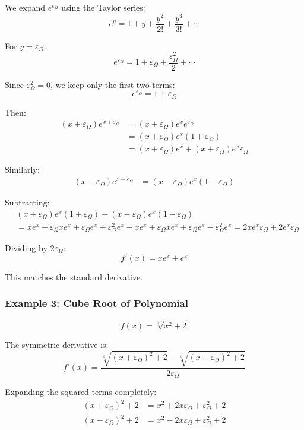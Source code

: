 \documentclass{article}
\begin{document}
We expand $e^{\varepsilon_\Omega}$ using the Taylor series:
$$e^y = 1 + y + \frac{y^2}{2!} + \frac{y^3}{3!} + \cdots$$

For $y = \varepsilon_\Omega$:
$$e^{\varepsilon_\Omega} = 1 + \varepsilon_\Omega + \frac{\varepsilon_\Omega^2}{2} + \cdots$$

Since $\varepsilon_\Omega^2 = 0$, we keep only the first two terms:
$$e^{\varepsilon_\Omega} = 1 + \varepsilon_\Omega$$

Then:
\begin{align*}
(x + \varepsilon_\Omega)e^{x + \varepsilon_\Omega} &= (x + \varepsilon_\Omega)e^x e^{\varepsilon_\Omega} \\
&= (x + \varepsilon_\Omega)e^x(1 + \varepsilon_\Omega) \\
&= (x + \varepsilon_\Omega)e^x + (x + \varepsilon_\Omega)e^x\varepsilon_\Omega
\end{align*}

Similarly:
\begin{align*}
(x - \varepsilon_\Omega)e^{x - \varepsilon_\Omega} &= (x - \varepsilon_\Omega)e^x(1 - \varepsilon_\Omega)
\end{align*}

Subtracting:
\begin{align*}
&(x + \varepsilon_\Omega)e^x(1 + \varepsilon_\Omega) - (x - \varepsilon_\Omega)e^x(1 - \varepsilon_\Omega) \\
&= xe^x+\varepsilon_\Omega xe^x+\varepsilon_\Omega e^x+\varepsilon_\Omega^2e^x-xe^x
+\varepsilon_\Omega xe^x+\varepsilon_\Omega e^x-\varepsilon_\Omega^2 e^x=2xe^x\varepsilon_\Omega + 2e^x\varepsilon_\Omega
\end{align*}

Dividing by $2\varepsilon_\Omega$:
$$f'(x) = xe^x + e^x$$

This matches the standard derivative.

\subsubsection{Example 3: Cube Root of Polynomial}

$$f(x) = \sqrt[3]{x^2 + 2}$$

The symmetric derivative is:
$$f'(x) = \frac{\sqrt[3]{(x + \varepsilon_\Omega)^2 + 2} - \sqrt[3]{(x - \varepsilon_\Omega)^2 + 2}}{2\varepsilon_\Omega}$$

Expanding the squared terms completely:
\begin{align*}
(x + \varepsilon_\Omega)^2 + 2 &= x^2 + 2x\varepsilon_\Omega + \varepsilon_\Omega^2 + 2 \\
(x - \varepsilon_\Omega)^2 + 2 &= x^2 - 2x\varepsilon_\Omega + \varepsilon_\Omega^2 + 2 
\end{align*}
\end{document}

